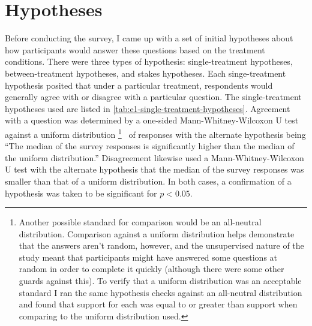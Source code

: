 \section{Hypotheses}

\label{sec:e1-hypotheses}

Before conducting the survey, I came up with a set of initial hypotheses about how participants would answer these questions based on the treatment conditions.
%
There were three types of hypothesis: single-treatment hypotheses, between-treatment hypotheses, and stakes hypotheses.
%
Each singe-treatment hypothesis posited that under a particular treatment, respondents would generally agree with or disagree with a particular question.
%
The single-treatment hypotheses used are listed in \cref{tab:e1-single-treatment-hypotheses}.
%
Agreement with a question was determined by a one-sided Mann-Whitney-Wilcoxon U test \citep{Mann1947,Wilcoxon1945} against a uniform distribution%
\footnote{%
Another possible standard for comparison would be an all-neutral distribution.
%
Comparison against a uniform distribution helps demonstrate that the answers aren't random, however, and the unsupervised nature of the study meant that participants might have answered some questions at random in order to complete it quickly (although there were some other guards against this).
%
To verify that a uniform distribution was an acceptable standard I ran the same hypothesis checks against an all-neutral distribution and found that support for each was equal to or greater than support when comparing to the uniform distribution used.
}%
\ of responses with the alternate hypothesis being ``The median of the survey responses is significantly higher than the median of the uniform distribution.''
%
Disagreement likewise used a Mann-Whitney-Wilcoxon U test with the alternate hypothesis that the median of the survey responses was smaller than that of a uniform distribution.
%
In both cases, a confirmation of a hypothesis was taken to be significant for $p < 0.05$.


